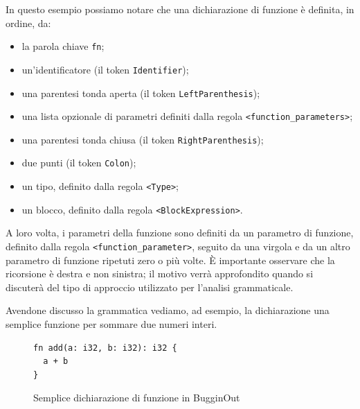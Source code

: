 In questo esempio possiamo notare che una dichiarazione di funzione \`e definita, in ordine, da:
\begin{itemize}
	\item la parola chiave \texttt{fn};
	\item un'identificatore (il token \texttt{Identifier});
	\item una parentesi tonda aperta (il token \texttt{LeftParenthesis});
	\item una lista opzionale di parametri definiti dalla regola \linebreak \texttt{<function\_parameters>};
	\item una parentesi tonda chiusa (il token \texttt{RightParenthesis});
	\item due punti (il token \texttt{Colon});
	\item un tipo, definito dalla regola \texttt{<Type>};
	\item un blocco, definito dalla regola \texttt{<BlockExpression>}.
\end{itemize}

A loro volta, i parametri della funzione sono definiti da un parametro di funzione, definito dalla regola \texttt{<function\_parameter>}, seguito da una virgola e da un altro parametro di funzione ripetuti zero o pi\`u volte. \`E importante osservare che la ricorsione \`e destra e non sinistra; il motivo verr\`a approfondito quando si discuter\`a del tipo di approccio utilizzato per l'analisi grammaticale.

Avendone discusso la grammatica vediamo, ad esempio, la dichiarazione una semplice funzione per sommare due numeri interi.
\begin{figure}[H]
	\centering
	\begin{verbatim}
fn add(a: i32, b: i32): i32 {
  a + b
}
	\end{verbatim}
	\caption{Semplice dichiarazione di funzione in BugginOut}
	\label{fig:bugginout-example-function-declaration}
\end{figure}

